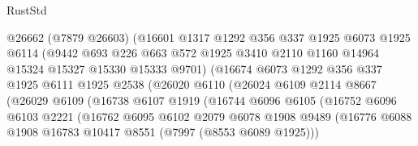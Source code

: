 \begin{lexlean}{RustStd}
\begin{coremodule}
{\begin{coremodule}
{{{{{{{{{{{{{{{{{{{{{{{{{{{{{{{{{{{{{{{{{{{                        @26662
                        (@7879 @26603)
                        (@16601
                          @1317
                          @1292
                          @356
                          @337
                          @1925
                          @6073
                          @1925
                          @6114
                          (@9442
                            @693
                            @226
                            @663
                            @572
                            @1925
                            @3410
                            @2110
                            @1160
                            @14964
                            @15324
                            @15327
                            @15330
                            @15333
                            @9701)
                          (@16674
                            @6073
                            @1292
                            @356
                            @337
                            @1925
                            @6111
                            @1925
                            @2538
                            (@26020
                              @6110
                              (@26024
                                @6109
                                @2114
                                @8667
                                (@26029
                                  @6109
                                  (@16738
                                    @6107
                                    @1919
                                    (@16744
                                      @6096
                                      @6105
                                      (@16752
                                        @6096
                                        @6103
                                        @2221
                                        (@16762
                                          @6095
                                          @6102
                                          @2079
                                          @6078
                                          @1908
                                          @9489
                                          (@16776
                                            @6088
                                            @1908
                                            @16783
                                            @10417
                                            @8551
                                            (@7997 (@8553 @6089 @1925)))
}}}}}}}}}}}}}}}}}}}}}}}}}}}}}}}}}}}}}}}}}}}
\end{coremodule}}
\end{coremodule}
\end{lexlean}
